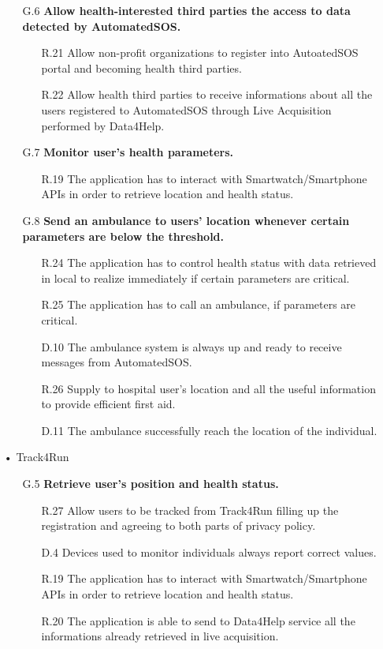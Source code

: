 \begin{enumerate}
\begin{enumerate}
	\item [G.6] \textbf{Allow health-interested third parties the access to data detected by AutomatedSOS.}
		\begin{enumerate}
		\item [R.21] Allow non-profit organizations to register into AutoatedSOS portal and becoming health third parties.
		\item [R.22] Allow health third parties to receive informations about all the users registered to AutomatedSOS through Live Acquisition performed by Data4Help.
		\end{enumerate}
	
	\item [G.7] \textbf{Monitor user's health parameters.}
		\begin{enumerate}
		\item [R.19] The application has to interact with Smartwatch/Smartphone APIs in order to retrieve location and health status.
		\end{enumerate}
		
	\item [G.8] \textbf{Send an ambulance to users' location whenever certain parameters are below the threshold.}
		\begin{enumerate}
		\item [R.24] The application has to control health status with data retrieved in local to realize immediately if certain parameters are critical.
		\item [R.25] The application has to call an ambulance, if parameters are critical.
		\item [D.10] The ambulance system is always up and ready to receive messages from AutomatedSOS.
		\item [R.26] Supply to hospital user's location and all the useful information to provide efficient first aid.
		\item [D.11] The ambulance successfully reach the location of the individual.
		\end{enumerate}
		
  	\end{enumerate}
  	
  	
\item[•]{\Large Track4Run}
	
	\begin{enumerate}
	\item [G.5] \textbf{Retrieve user's position and health status.}
		\begin{enumerate}
		\item [R.27] Allow users to be tracked from Track4Run filling up the registration and agreeing to both parts of privacy policy.
		\item [D.4] Devices used to monitor individuals always report correct values.
		\item [R.19] The application has to interact with Smartwatch/Smartphone APIs in order to retrieve location and health status.
		\item [R.20] The application is able to send to Data4Help service all the informations already retrieved in live acquisition.
		\end{enumerate}
		

\end{enumerate}
\end{enumerate}
